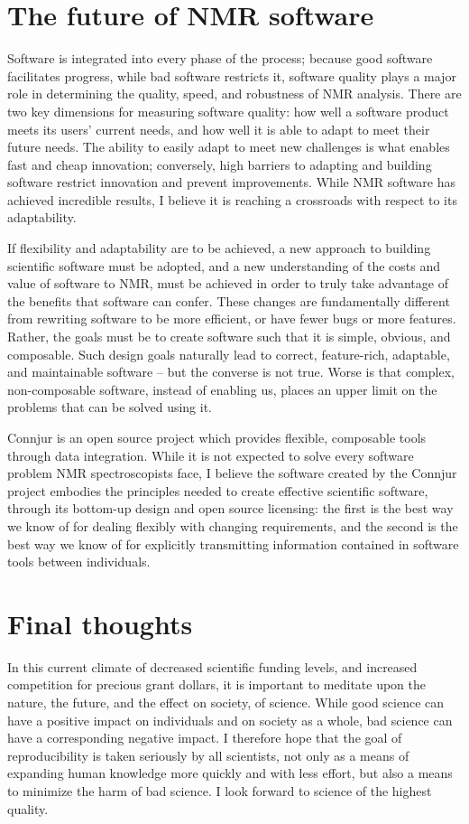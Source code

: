 \section{The future of NMR software}
Software is integrated into every phase of the process;
because good software facilitates progress, while bad software restricts it,
software quality plays a major role in determining the quality, speed, and 
robustness of NMR analysis. 
There are two key dimensions for measuring software quality: how well a 
software product meets its users' current needs, and how well it is able to
adapt to meet their future needs.  The ability to easily adapt to meet new 
challenges is what enables fast and cheap innovation; conversely, high
barriers to adapting and building software restrict innovation and prevent
improvements.  While NMR software has achieved incredible results, I believe
it is reaching a crossroads with respect to its adaptability.

If flexibility and adaptability are to be achieved,
a new approach to building scientific software must be adopted, and 
a new understanding of the costs and value of software to NMR, must be 
achieved in order to truly take advantage of the benefits that software can
confer.  These changes are fundamentally different from rewriting software
to be more efficient, or have fewer bugs or more features.  Rather, the
goals must be to create software such that it is simple, obvious, and 
composable.  Such design goals naturally lead to correct, feature-rich, 
adaptable, and maintainable software -- but the converse is not true.  Worse
is that complex, non-composable software, instead of enabling
us, places an upper limit on the problems that can be solved using it.

Connjur is an open source project which provides flexible, composable tools
through data integration.  While it is not expected to solve every software
problem NMR spectroscopists face, I believe the software created by the Connjur
project embodies the principles needed to create effective scientific
software, through its bottom-up design and open source licensing:
the first is the best way we know of for dealing flexibly with changing
requirements, and the second is the best way we know of for explicitly 
transmitting information contained in software tools between individuals.


\section{Final thoughts}
In this current climate of decreased scientific funding levels, and increased
competition for precious grant dollars, it is important to meditate upon the
nature, the future, and the effect on society, of science.
While good science can have a positive impact on individuals and on society 
as a whole, bad science can have a corresponding negative impact.
I therefore hope that the goal of reproducibility is taken seriously by all
scientists, not only as a means of expanding human knowledge more quickly and
with less effort, but also a means to minimize the harm of bad science.
I look forward to science of the highest quality.

